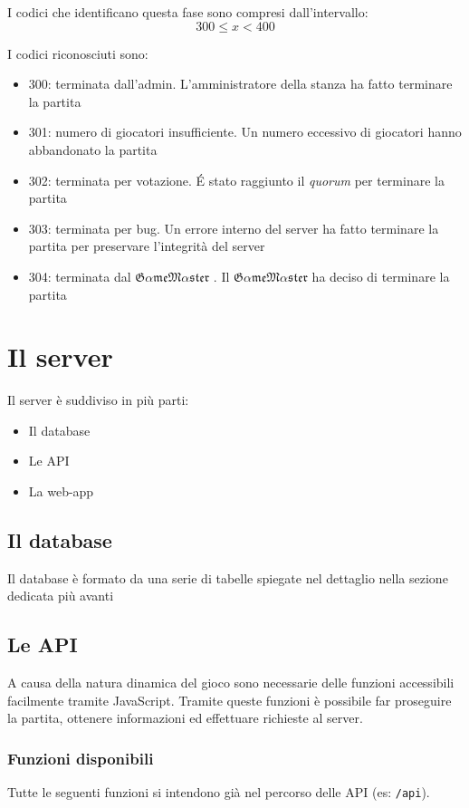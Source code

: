 \documentclass[10pt,a4paper]{article}
\newcommand{\pageurl}[1]{\small\texttt{#1}}
\newcommand{\GameMaster}{
$\mathfrak{G\alpha me}
\allowbreak \mathfrak{M\alpha ster}$
}
\begin{document}
I codici che identificano questa fase sono compresi dall'intervallo:
\[
	300 \le x < 400
\]

I codici riconosciuti sono:
\begin{itemize}
\item 300: terminata dall'admin. L'amministratore della stanza ha fatto terminare la partita
\item 301: numero di giocatori insufficiente. Un numero eccessivo di giocatori hanno abbandonato la partita
\item 302: terminata per votazione. \'E stato raggiunto il \emph{quorum} per terminare la partita
\item 303: terminata per bug. Un errore interno del server ha fatto terminare la partita per preservare l'integrità del server
\item 304: terminata dal \GameMaster. Il \GameMaster ha deciso di terminare la partita
\end{itemize}

\section{Il server}
Il server è suddiviso in più parti:
\begin{itemize}
\item Il database
\item Le API
\item La web-app
\end{itemize}

\subsection{Il database}
Il database è formato da una serie di tabelle spiegate nel dettaglio nella sezione dedicata più avanti

\subsection{Le API}
A causa della natura dinamica del gioco sono necessarie delle funzioni accessibili facilmente tramite JavaScript. Tramite queste funzioni è possibile far proseguire la partita, ottenere informazioni ed effettuare richieste al server.

\subsubsection*{Funzioni disponibili}
Tutte le seguenti funzioni si intendono già nel percorso delle API (es: \pageurl{/api}). 
\end{document}
